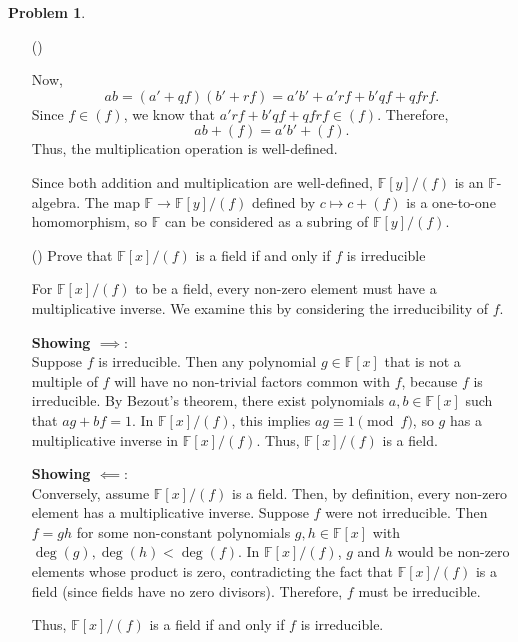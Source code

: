 \documentclass[12pt]{article}
\theoremstyle{definition}
\newtheorem{problem}{Problem}
\newcounter{subq}[problem]
\newenvironment{subproblem}
{\refstepcounter{subq} \begin{itemize} \item[(\alph{subq})]}
{\end{itemize} \medskip}
\begin{document}
\begin{problem}
\begin{subproblem}
\begin{solution}
            Now,
            \[
            ab = (a' + qf)(b' + rf) = a'b' + a'rf + b'qf + qfrf.
            \]
            Since $f \in (f)$, we know that $a'rf + b'qf + qfrf \in (f)$. Therefore,
            \[
            ab + (f) = a'b' + (f).
            \]
            Thus, the multiplication operation is well-defined.

            Since both addition and multiplication are well-defined, $\mathbb{F}[y]/(f)$ is an $\mathbb{F}$-algebra. The map $\mathbb{F} \longrightarrow \mathbb{F}[y]/(f)$ defined by $c \mapsto c + (f)$ is a one-to-one homomorphism, so $\mathbb{F}$ can be considered as a subring of $\mathbb{F}[y]/(f)$.
        \end{solution}
    \end{subproblem}

    \begin{subproblem}
        Prove that $\mathbb{F}[x]/(f)$ is a field if and only if $f$ is irreducible

        \begin{solution}
            For \(\mathbb{F}[x]/(f)\) to be a field, every non-zero element must have a multiplicative inverse. We examine this by considering the irreducibility of \(f\).

            \textbf{Showing $\implies$}:\\
            Suppose \(f\) is irreducible. Then any polynomial \(g \in \mathbb{F}[x]\) that is not a multiple of \(f\) will have no non-trivial factors common with \(f\), because \(f\) is irreducible. By Bezout's theorem, there exist polynomials \(a, b \in \mathbb{F}[x]\) such that \(ag + bf = 1\). In \(\mathbb{F}[x]/(f)\), this implies \(ag \equiv 1 \pmod{f}\), so \(g\) has a multiplicative inverse in \(\mathbb{F}[x]/(f)\). Thus, \(\mathbb{F}[x]/(f)\) is a field.

            \textbf{Showing $\impliedby$}:\\
            Conversely, assume \(\mathbb{F}[x]/(f)\) is a field. Then, by definition, every non-zero element has a multiplicative inverse. Suppose \(f\) were not irreducible. Then \(f = gh\) for some non-constant polynomials \(g, h \in \mathbb{F}[x]\) with \(\deg(g), \deg(h) < \deg(f)\). In \(\mathbb{F}[x]/(f)\), \(g\) and \(h\) would be non-zero elements whose product is zero, contradicting the fact that \(\mathbb{F}[x]/(f)\) is a field (since fields have no zero divisors). Therefore, \(f\) must be irreducible.

            Thus, \(\mathbb{F}[x]/(f)\) is a field if and only if \(f\) is irreducible.
        \end{solution}
    \end{subproblem}


\end{problem}
\end{document}
